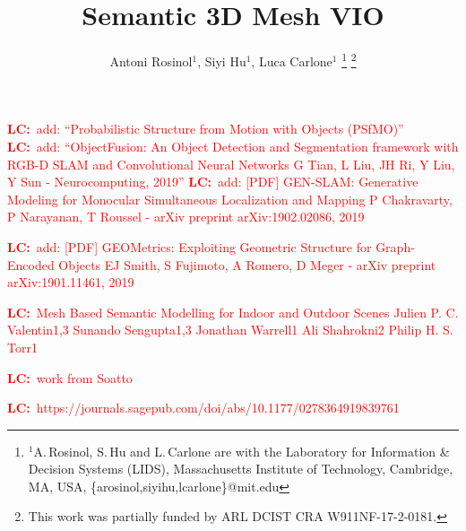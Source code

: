 \documentclass[letterpaper, 10 pt, journal, twoside]{IEEEtran}  %
\title{Semantic 3D Mesh VIO}
\author{Antoni Rosinol$^{1}$, Siyi Hu$^{1}$, Luca Carlone$^{1}$
\thanks{$^{1}$A.\,Rosinol, S.\,Hu and L.\,Carlone are with the Laboratory for
Information \& Decision Systems (LIDS), Massachusetts Institute of Technology, Cambridge, MA, USA,
{\sf \{arosinol,siyihu,lcarlone\}@mit.edu}}
\thanks{This work was partially funded by ARL DCIST CRA W911NF-17-2-0181.}}%
\newcommand{\LC}[1]{\textcolor{red}{{\bf LC:}~#1}}
\begin{document}
\LC{add: ``Probabilistic Structure from Motion with Objects (PSfMO)''}
\LC{add: ``ObjectFusion: An Object Detection and Segmentation framework with RGB-D SLAM and Convolutional Neural Networks
G Tian, L Liu, JH Ri, Y Liu, Y Sun - Neurocomputing, 2019''}
\LC{add: [PDF] GEN-SLAM: Generative Modeling for Monocular Simultaneous Localization and Mapping
P Chakravarty, P Narayanan, T Roussel - arXiv preprint arXiv:1902.02086, 2019}

\LC{add: [PDF] GEOMetrics: Exploiting Geometric Structure for Graph-Encoded Objects
EJ Smith, S Fujimoto, A Romero, D Meger - arXiv preprint arXiv:1901.11461, 2019}

\LC{Mesh Based Semantic Modelling for Indoor and Outdoor Scenes
Julien P. C. Valentin1,3 Sunando Sengupta1,3 Jonathan Warrell1 Ali Shahrokni2 Philip H. S. Torr1}

\LC{work from Soatto}

\LC{https://journals.sagepub.com/doi/abs/10.1177/0278364919839761}

\maketitle













%
\end{document}
